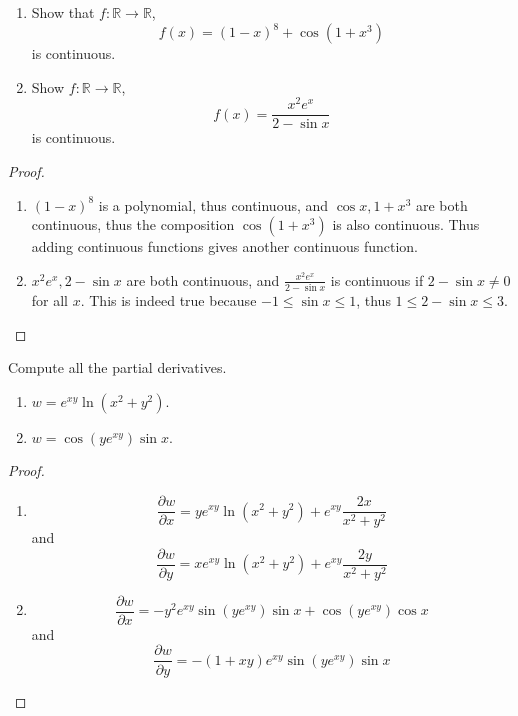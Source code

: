 \documentclass[openany]{book}
\newcommand{\R}{\mathbb{R}}
\begin{document}
\begin{prob}
    \begin{enumerate}
        \item[(a)] Show that $f:\R\to\R$,
        \begin{equation*}
            f(x)=(1-x)^8+\cos(1+x^3)
        \end{equation*}
        is continuous.
        \item[(b)] Show $f:\R\to\R$, 
        \begin{equation*}
            f(x)=\frac{x^2e^x}{2-\sin x}
        \end{equation*}
        is continuous.
    \end{enumerate}
\end{prob}
\begin{proof}
    \begin{enumerate}
        \item[(a)] $(1-x)^8$ is a polynomial, thus continuous, and $\cos x, 1+x^3$ are both continuous, thus the composition $\cos(1+x^3)$ is also continuous. Thus adding continuous functions gives another continuous function.
        \item[(b)] $x^2e^x, 2-\sin x$ are both continuous, and $\frac{x^2e^x}{2-\sin x}$ is continuous if $2-\sin x\neq 0$ for all $x$. This is indeed true because $-1\leq\sin x\leq 1$, thus $1\leq 2-\sin x\leq 3$.
    \end{enumerate}
\end{proof}


\begin{prob}
    Compute all the partial derivatives.
    \begin{enumerate}
        \item $w=e^{xy}\ln(x^2+y^2)$.
        \item $w=\cos(ye^{xy})\sin x$.
    \end{enumerate}
\end{prob}
\begin{proof}
    \begin{enumerate}
        \item \begin{equation*}
            \frac{\partial w}{\partial x}=ye^{xy}\ln(x^2+y^2)+e^{xy}\frac{2x}{x^2+y^2}
        \end{equation*}
        and 
        \begin{equation*}
            \frac{\partial w}{\partial y}=xe^{xy}\ln(x^2+y^2)+e^{xy}\frac{2y}{x^2+y^2}
        \end{equation*}
        \item \begin{equation*}
            \frac{\partial w}{\partial x}=-y^2e^{xy}\sin (ye^{xy})\sin x+\cos(ye^{xy})\cos x
        \end{equation*}
        and 
        \begin{equation*}
            \frac{\partial w}{\partial y}=-(1+xy)e^{xy}\sin(ye^{xy})\sin x
        \end{equation*}
    \end{enumerate}
\end{proof}
\end{document}
